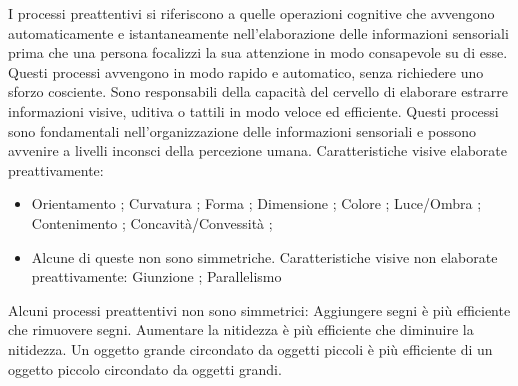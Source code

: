 I processi preattentivi si riferiscono a quelle operazioni cognitive che avvengono automaticamente e
 istantaneamente nell'elaborazione delle informazioni sensoriali prima che una persona focalizzi la sua attenzione in modo consapevole su di esse. 
 Questi processi avvengono in modo rapido e automatico, senza richiedere uno sforzo cosciente.
Sono responsabili della capacità del cervello di elaborare estrarre informazioni visive, uditiva o tattili in modo veloce ed efficiente. Questi processi sono fondamentali nell'organizzazione delle informazioni sensoriali e possono avvenire a livelli inconsci della percezione umana.
Caratteristiche visive elaborate preattivamente:
\begin{itemize}
    \item Orientamento ; Curvatura ; Forma ; Dimensione ; Colore ;
    Luce/Ombra ; Contenimento ; Concavità/Convessità ;
    \item Alcune di queste non sono simmetriche.
        Caratteristiche visive non elaborate preattivamente:
        Giunzione ; Parallelismo
\end{itemize}
Alcuni processi preattentivi non sono simmetrici:
Aggiungere segni è più efficiente che rimuovere segni.
Aumentare la nitidezza è più efficiente che diminuire la nitidezza.
Un oggetto grande circondato da oggetti piccoli è più efficiente di un oggetto piccolo circondato da oggetti grandi.

